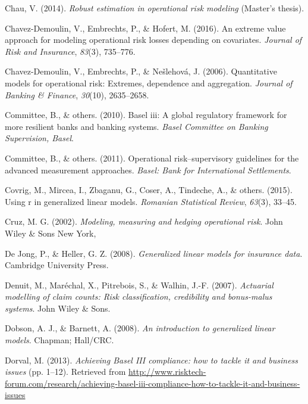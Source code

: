 \documentclass{DissertateUSU}
\begin{document}
\leavevmode\hypertarget{ref-chau2014robust}{}%
Chau, V. (2014). \emph{Robust estimation in operational risk modeling}
(Master's thesis).

\leavevmode\hypertarget{ref-chavez2016extreme}{}%
Chavez-Demoulin, V., Embrechts, P., \& Hofert, M. (2016). An extreme
value approach for modeling operational risk losses depending on
covariates. \emph{Journal of Risk and Insurance}, \emph{83}(3),
735--776.

\leavevmode\hypertarget{ref-chavez2006quantitative}{}%
Chavez-Demoulin, V., Embrechts, P., \& Nešlehová, J. (2006).
Quantitative models for operational risk: Extremes, dependence and
aggregation. \emph{Journal of Banking \& Finance}, \emph{30}(10),
2635--2658.

\leavevmode\hypertarget{ref-basel2010basel}{}%
Committee, B., \& others. (2010). Basel iii: A global regulatory
framework for more resilient banks and banking systems. \emph{Basel
Committee on Banking Supervision, Basel}.

\leavevmode\hypertarget{ref-basel2011operational}{}%
Committee, B., \& others. (2011). Operational risk--supervisory
guidelines for the advanced measurement approaches. \emph{Basel: Bank
for International Settlements}.

\leavevmode\hypertarget{ref-covrig2015using}{}%
Covrig, M., Mircea, I., Zbaganu, G., Coser, A., Tindeche, A., \& others.
(2015). Using r in generalized linear models. \emph{Romanian Statistical
Review}, \emph{63}(3), 33--45.

\leavevmode\hypertarget{ref-cruz2002modeling}{}%
Cruz, M. G. (2002). \emph{Modeling, measuring and hedging operational
risk}. John Wiley \& Sons New York,

\leavevmode\hypertarget{ref-de2008generalized}{}%
De Jong, P., \& Heller, G. Z. (2008). \emph{Generalized linear models
for insurance data}. Cambridge University Press.

\leavevmode\hypertarget{ref-denuit2007actuarial}{}%
Denuit, M., Maréchal, X., Pitrebois, S., \& Walhin, J.-F. (2007).
\emph{Actuarial modelling of claim counts: Risk classification,
credibility and bonus-malus systems}. John Wiley \& Sons.

\leavevmode\hypertarget{ref-dobson2008introduction}{}%
Dobson, A. J., \& Barnett, A. (2008). \emph{An introduction to
generalized linear models}. Chapman; Hall/CRC.

\leavevmode\hypertarget{ref-mysis2013}{}%
Dorval, M. (2013). \emph{Achieving Basel III compliance: how to tackle
it and business issues} (pp. 1--12). Retrieved from
\url{http://www.risktech-forum.com/research/achieving-basel-iii-compliance-how-to-tackle-it-and-business-issues}
\end{document}
